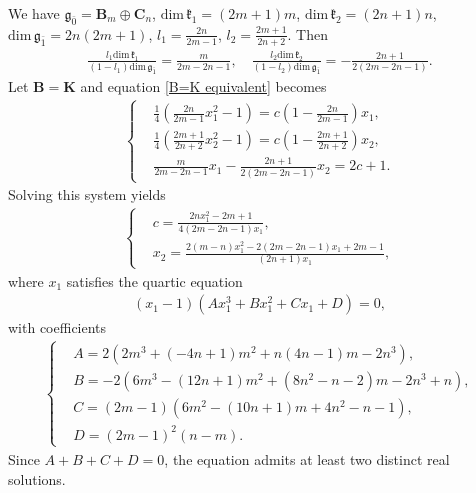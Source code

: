 \documentclass[reqno]{amsart}
\theoremstyle{definition}
\begin{document}
We have $\mathfrak{g}_{\bar{0}}=\mathbf{B}_{m}\oplus \mathbf{C}_{n}$, $\mathrm{dim}\,\mathfrak{k}_{1}=(2m+1)m$, $\mathrm{dim}\,\mathfrak{k}_{2}=(2n+1)n$, $\mathrm{dim}\,\mathfrak{g}_{\bar{1}}=2n(2m+1)$, $l_{1}=\frac{2n}{2m-1}$, $l_{2}=\frac{2m+1}{2n+2}$. Then
\begin{eqnarray*}
\frac{l_{1}\mathrm{dim}\,\mathfrak{k}_{1}}{(1-l_{1})\mathrm{dim}\,\mathfrak{g}_{\bar{1}}}=\frac{m}{2m-2n-1},\quad
\frac{l_{2}\mathrm{dim}\,\mathfrak{k}_{2}}{(1-l_{2})\mathrm{dim}\,\mathfrak{g}_{\bar{1}}}=-\frac{2n+1}{2(2m-2n-1)}.
\end{eqnarray*}
Let $\mathbf{B}=\mathbf{K}$ and  equation \eqref{B=K equivalent} becomes
\begin{eqnarray*}
\left\{
\begin{aligned}
&\frac{1}{4}\left(\frac{2n}{2m-1}x_{1}^{2}-1\right)=c\left(1-\frac{2n}{2m-1}\right)x_{1},\\
&\frac{1}{4}\left(\frac{2m+1}{2n+2}x_{2}^{2}-1\right)=c\left(1-\frac{2m+1}{2n+2}\right)x_{2},\\
&\frac{m}{2m-2n-1}x_{1}-\frac{2n+1}{2(2m-2n-1)}x_{2}=2c+1.
\end{aligned}\right.
\end{eqnarray*}
Solving this system yields
\begin{eqnarray*}
\left\{
\begin{aligned}
&c=\frac{2nx_{1}^{2}-2m+1}{4(2m-2n-1)x_{1}},\\
&x_{2}=\frac{2(m-n)x_{1}^{2}-2(2m-2n-1)x_{1}+2m-1}{(2n+1)x_{1}},
\end{aligned}\right.
\end{eqnarray*}
where $x_{1}$ satisfies  the quartic equation
\begin{eqnarray*}
(x_{1}-1)(A x_{1}^{3}+B x_{1}^{2}+C x_{1}+D)=0,
\end{eqnarray*}
with coefficients
\begin{eqnarray*}
\left\{
\begin{aligned}
&A=2\left( 2m^{3}+(-4n+1)m^{2}+n(4n-1)m-2n^{3}\right),\\
&B=-2\left( 6m^{3}-(12n+1)m^{2}+(8n^{2}-n-2)m-2n^{3}+n\right),\\
&C=(2m-1)\left( 6m^{2}-(10n+1)m+4n^{2}-n-1\right),\\
&D=(2m-1)^{2}(n-m).
\end{aligned}\right.
\end{eqnarray*}
Since $A+B+C+D=0$,
the equation admits at least two distinct real solutions.
\end{document}
